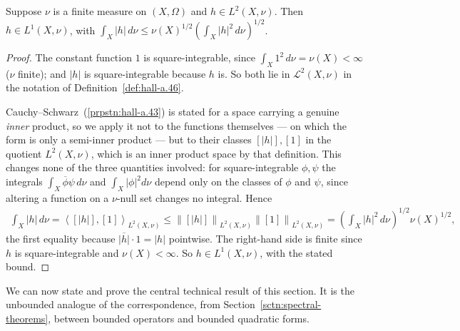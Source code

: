 \begin{lemma}
    \label{lmm:l2-implies-l1}
    \leanok
    Suppose $\nu$ is a finite measure on $(X,\Omega)$ and $h \in L^2(X,\nu)$. Then $h \in L^1(X,\nu)$, with $\int_X \lvert h \rvert \, d\nu \le \nu(X)^{1/2} \left( \int_X \lvert h \rvert^2 \, d\nu \right)^{1/2}$.
\end{lemma}
\begin{proof}
    \leanok
The constant function $1$ is square-integrable, since $\int_X 1^2 \, d\nu = \nu(X) < \infty$ ($\nu$ finite); and $\lvert h \rvert$ is square-integrable because $h$ is. So both lie in $\mathcal{L}^2(X,\nu)$ in the notation of Definition~\ref{def:hall-a.46}.

Cauchy–Schwarz~(\ref{prpstn:hall-a.43}) is stated for a space carrying a genuine \textit{inner} product, so we apply it not to the functions themselves — on which the form is only a semi-inner product — but to their classes $[\lvert h \rvert], [1]$ in the quotient $L^2(X,\nu)$, which is an inner product space by that definition. This changes none of the three quantities involved: for square-integrable $\phi,\psi$ the integrals $\int_X \overline{\phi}\psi \, d\nu$ and $\int_X \lvert \phi \rvert^2 d\nu$ depend only on the classes of $\phi$ and $\psi$, since altering a function on a $\nu$-null set changes no integral. Hence
\begin{align}
    \int_X \lvert h \rvert \, d\nu = \left< [\lvert h \rvert], [1] \right>_{L^2(X,\nu)} \le \left\| [\lvert h \rvert] \right\|_{L^2(X,\nu)} \left\| [1] \right\|_{L^2(X,\nu)} = \left( \int_X \lvert h \rvert^2 \, d\nu \right)^{1/2} \nu(X)^{1/2},
\end{align}
the first equality because $\overline{\lvert h \rvert}\cdot 1 = \lvert h \rvert$ pointwise. The right-hand side is finite since $h$ is square-integrable and $\nu(X) < \infty$. So $h \in L^1(X,\nu)$, with the stated bound.
\end{proof}

We can now state and prove the central technical result of this section. It is the unbounded analogue of the correspondence, from Section~\ref{sctn:spectral-theorems}, between bounded operators and bounded quadratic forms.


